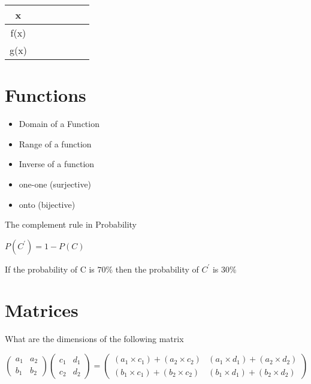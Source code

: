 \documentclass{article}
\begin{document}
\begin{tabular}{ccccccc}
 x & & & & & & \\ \hline
 f(x) & & & & & & \\ \hline
 g(x) & & & & & & \\ \hline
\end{tabular}


\section*{Functions}
\begin{itemize}
\item Domain of a Function
\item Range of a function
\item Inverse of a function
\end{itemize}
\begin{itemize}
\item one-one (surjective)
\item onto (bijective)
\end{itemize}



The complement rule in Probability

$P(C^{\prime}) = 1- P(C)$

 

If the probability of C is $70 \%$ then the probability of $C^{\prime}$ is $30\%$
\section{Matrices}

What are the dimensions of the following matrix


\[ \left(
\begin{array}{cc}
a_1 & a_2 \\ 
b_1 & b_2
\end{array} \right)\left(
\begin{array}{cc}
c_1 & d_1 \\ 
c_2 & d_2
\end{array} \right) = \left(
\begin{array}{cc}
(a_1 \times c_1) + (a_2 \times c_2) & (a_1 \times d_1) + (a_2 \times d_2) \\ 
(b_1 \times c_1) + (b_2 \times c_2) & (b_1 \times d_1) + (b_2 \times d_2)
\end{array} \right) \]
\end{document}
